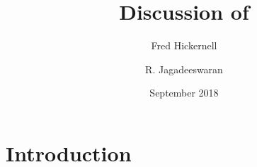 \documentclass{article}
\title{Discussion of }
\author{Fred Hickernell}
\author{R. Jagadeeswaran}
\date{September 2018}
\begin{document}
\maketitle

\section{Introduction}
\end{document}
